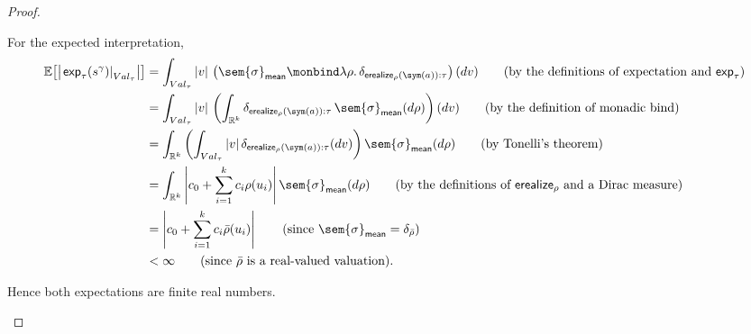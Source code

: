 \begin{proof}
\begin{enumerate}
    For the expected interpretation,
    \begin{align}
      \mathbb E\!\left[
        \left|
          \left.\mathsf{exp}_\tau(s^\gamma)\right|_{Val_\tau}
        \right|
      \right]
      &=
      \int_{Val_\tau}
        |v|\,
        \left(
          \sem{\sigma}_{\mathsf{mean}}
          \monbind
          \lambda\rho.\,
          \delta_{\mathsf{erealize}_\rho(\sym(a)):\tau}
        \right)(dv)
      \tag{\text{by the definitions of expectation and $\mathsf{exp}_\tau$}}
      \\
      &=
      \int_{Val_\tau}
        |v|\,
        \left(
          \int_{\mathbb R^k}
            \delta_{\mathsf{erealize}_\rho(\sym(a)):\tau}
            \,\sem{\sigma}_{\mathsf{mean}}(d\rho)
        \right)(dv)
      \tag{\text{by the definition of monadic bind}}
      \\
      &=
      \int_{\mathbb R^k}
        \left(
          \int_{Val_\tau}
            |v|\,
            \delta_{\mathsf{erealize}_\rho(\sym(a)):\tau}(dv)
        \right)
        \sem{\sigma}_{\mathsf{mean}}(d\rho)
      \tag{\text{by Tonelli's theorem}}
      \\
      &=
      \int_{\mathbb R^k}
        \left|
          c_0+\sum_{i=1}^k c_i\rho(u_i)
        \right|
        \sem{\sigma}_{\mathsf{mean}}(d\rho)
      \tag{\text{by the definitions of $\mathsf{erealize}_\rho$ and a Dirac measure}}
      \\
      &=
      \left|
        c_0+\sum_{i=1}^k c_i\bar\rho(u_i)
      \right|
      \tag{\text{since $\sem{\sigma}_{\mathsf{mean}}=\delta_{\bar\rho}$}}
      \\
      &<
      \infty
      \tag{\text{since $\bar\rho$ is a real-valued valuation}}.
    \end{align}

    Hence both expectations are finite real numbers.


\end{enumerate}
\end{proof}
